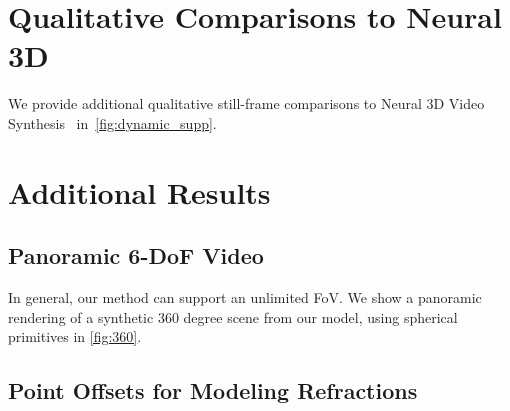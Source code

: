 \documentclass[10pt,twocolumn,letterpaper]{article}
\begin{document}
 \begin{table}
\caption{\label{tab:quant_google}\textbf{Quantitative comparisons to DeepView.}
  In addition to the comparison to NeRFPlayer, we report a comparison with DeepView \cite{FlynnBDDFOST2019}, a variant of which
  is used per-frame in immersive LF video \cite{BroxtFOEHDDBWD2020}.
  We thus compare to DeepView as a proxy for quantitative comparison.
  FPS normalized per megapixel.
}
\vspace{-2mm}
\renewcommand{\arraystretch}{1}
\centering
{}
\end{table}
 
\section{Qualitative Comparisons to Neural 3D~\cite{LiSZGLKSLGL2022}}
\label{sec:additional_n3d}

We provide additional qualitative still-frame comparisons to Neural 3D Video Synthesis~\cite{LiSZGLKSLGL2022} in~\cref{fig:dynamic_supp}.


\section{Additional Results}
\label{sec:additional_results}

\subsection{Panoramic 6-DoF Video}

In general, our method can support an unlimited FoV. We show a panoramic rendering of a synthetic 360 degree scene from our model, using spherical primitives in \cref{fig:360}.

\subsection{Point Offsets for Modeling Refractions}
\end{document}
